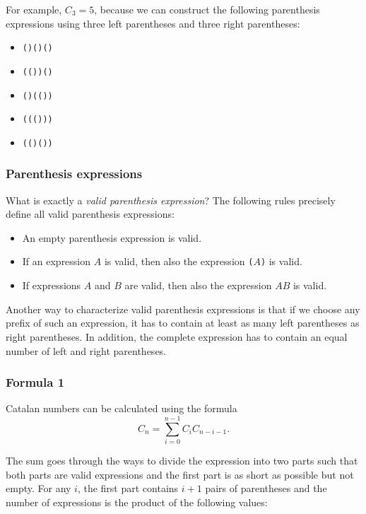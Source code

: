 For example, $C_3=5$, because
we can construct the following parenthesis
expressions using three
left parentheses and three right parentheses:

\begin{itemize}[noitemsep]
\item \texttt{()()()}
\item \texttt{(())()}
\item \texttt{()(())}
\item \texttt{((()))}
\item \texttt{(()())}
\end{itemize}

\subsubsection{Parenthesis expressions}


What is exactly a \emph{valid parenthesis expression}?
The following rules precisely define all
valid parenthesis expressions:

\begin{itemize}
\item An empty parenthesis expression is valid.
\item If an expression $A$ is valid,
then also the expression
\texttt{(}$A$\texttt{)} is valid.
\item If expressions $A$ and $B$ are valid,
then also the expression $AB$ is valid.
\end{itemize}

Another way to characterize valid 
parenthesis expressions is that if
we choose any prefix of such an expression,
it has to contain at least as many left
parentheses as right parentheses.
In addition, the complete expression has to
contain an equal number of left and right
parentheses.

\subsubsection{Formula 1}

Catalan numbers can be calculated using the formula
\[ C_n = \sum_{i=0}^{n-1} C_{i} C_{n-i-1}.\]

The sum goes through the ways to divide the
expression into two parts
such that both parts are valid
expressions and the first part is as short as possible
but not empty.
For any $i$, the first part contains $i+1$ pairs
of parentheses and the number of expressions
is the product of the following values:

